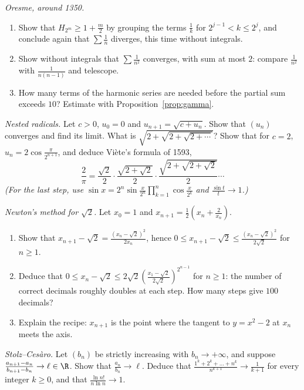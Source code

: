 \begin{exercise}[$\star$]\label{ex:oresme}
\emph{Oresme, around 1350.}
\begin{enumerate}[label=(\alph*)]
\item Show that $H_{2^m}\ge1+\frac m2$ by grouping the terms $\frac1k$ for $2^{j-1}<k\le2^j$, and conclude again that $\sum\frac1n$ diverges, this time without integrals.
\item Show without integrals that $\sum\frac1{n^2}$ converges, with sum at most $2$: compare $\frac1{n^2}$ with $\frac1{n(n-1)}$ and telescope.
\item How many terms of the harmonic series are needed before the partial sum exceeds $10$? Estimate with Proposition~\ref{prop:gamma}.
\end{enumerate}
\end{exercise}

\begin{exercise}[$\star$]\label{ex:nested}
\emph{Nested radicals.} Let $c>0$, $u_0=0$ and $u_{n+1}=\sqrt{c+u_n}$. Show that $(u_n)$ converges and find its limit. What is $\sqrt{2+\sqrt{2+\sqrt{2+\cdots}}}$? Show that for $c=2$, $u_n=2\cos\frac\pi{2^{n+1}}$, and deduce Vi\`ete's formula of 1593,
\[
\frac2\pi=\frac{\sqrt2}2\cdot\frac{\sqrt{2+\sqrt2}}2\cdot\frac{\sqrt{2+\sqrt{2+\sqrt2}}}2\cdots
\]
\emph{(For the last step, use $\sin x=2^n\sin\frac x{2^n}\prod_{k=1}^n\cos\frac x{2^k}$ and $\frac{\sin t}t\to1$.)}
\end{exercise}

\begin{exercise}[$\star\star$]\label{ex:newton}
\emph{Newton's method for $\sqrt2$.} Let $x_0=1$ and $x_{n+1}=\frac12\left(x_n+\frac2{x_n}\right)$.
\begin{enumerate}[label=(\alph*)]
\item Show that $x_{n+1}-\sqrt2=\frac{(x_n-\sqrt2)^2}{2x_n}$, hence $0\le x_{n+1}-\sqrt2\le\frac{(x_n-\sqrt2)^2}{2\sqrt2}$ for $n\ge1$.
\item Deduce that $0\le x_n-\sqrt2\le2\sqrt2\left(\frac{x_1-\sqrt2}{2\sqrt2}\right)^{2^{n-1}}$ for $n\ge1$: the number of correct decimals roughly doubles at each step. How many steps give $100$ decimals?
\item Explain the recipe: $x_{n+1}$ is the point where the tangent to $y=x^2-2$ at $x_n$ meets the axis.
\end{enumerate}
\end{exercise}

\begin{exercise}[$\star\star$]\label{ex:stolz}
\emph{Stolz--Ces\`aro.} Let $(b_n)$ be strictly increasing with $b_n\to+\infty$, and suppose $\frac{a_{n+1}-a_n}{b_{n+1}-b_n}\to\ell\in\R$. Show that $\frac{a_n}{b_n}\to\ell$.
Deduce that $\frac{1^k+2^k+\dots+n^k}{n^{k+1}}\to\frac1{k+1}$ for every integer $k\ge0$, and that $\frac{\ln n!}{n\ln n}\to1$.
\end{exercise}

